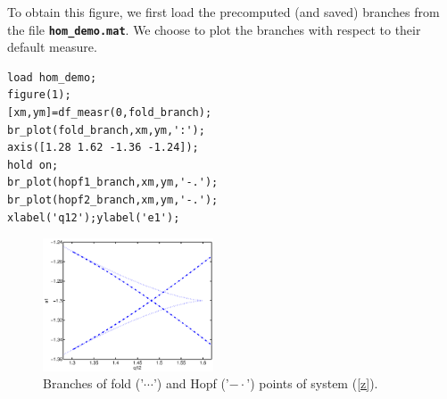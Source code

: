 \documentclass[10pt]{scrartcl}
\newcommand{\file}[1]{\textbf{\texttt{#1}}}
\begin{document}
To obtain this figure, we first load the precomputed (and saved)
branches from the file \file{hom\_demo.mat}.  We choose to plot the
branches with respect to their default measure.
\begin{lstlisting}
load hom_demo;
figure(1);
[xm,ym]=df_measr(0,fold_branch);
br_plot(fold_branch,xm,ym,':');
axis([1.28 1.62 -1.36 -1.24]);
hold on;
br_plot(hopf1_branch,xm,ym,'-.');
br_plot(hopf2_branch,xm,ym,'-.');
xlabel('q12');ylabel('e1');  
\end{lstlisting}
\begin{figure}[ht]
\begin{center}
\includegraphics[width=0.45\textwidth]{fig/hom_demfig00}
\caption{\label{demo3-1}Branches of fold ('$\cdots$') and Hopf
  ('$-\cdot$') points of system (\ref{z}).}
\end{center}
\end{figure}
\end{document}
